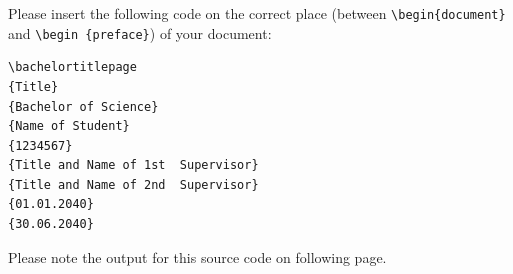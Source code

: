 \documentclass[ trackchanges, hyperref, pdf, mp, mppdf, en]{wise}
\newcommand\code[1]{\texttt{#1}}
\newcommand\command[1]{\code{\textbackslash{}#1}}
\begin{document}
\begin{appendix}
\begin{appendices}
Please insert the following code on the correct place (between \command{begin\{document\} } and \command{begin \{preface\}}) of your document:

\lstlatex 

\begin{lstlisting}
\bachelortitlepage
{Title}
{Bachelor of Science}
{Name of Student}
{1234567}
{Title and Name of 1st  Supervisor}
{Title and Name of 2nd  Supervisor}
{01.01.2040}
{30.06.2040}
\end{lstlisting} 

Please note the output for this source code on following page. 



\clearpage




\end{appendices}\end{appendix}
\end{document}

